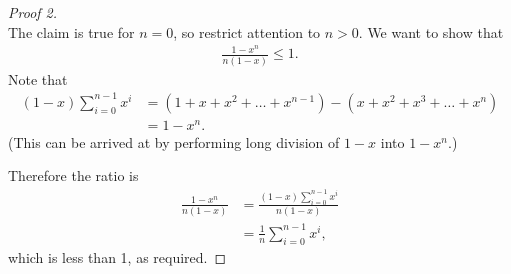 \begin{proof}[Proof 2]~\\
  The claim is true for $n=0$, so restrict attention to $n > 0$. We want to show that
  \begin{align*}
    \frac{1 - x^n}{n(1 - x)} \leq 1.
  \end{align*}
  Note that
  \begin{align*}
    (1 - x)\sum_{i=0}^{n-1}x^i &= (1 + x + x^2 + \ldots + x^{n-1}) - (x + x^2 + x^3 + \ldots + x^n)\\
                              &= 1 - x^n.
  \end{align*}
  (This can be arrived at by performing long division of $1-x$ into $1 - x^n$.)

  Therefore the ratio is
  \begin{align*}
    \frac{1 - x^n}{n(1 - x)} &= \frac{(1 - x)\sum_{i=0}^{n-1}x^i}{n(1 - x)}\\
                             &= \frac{1}{n}\sum_{i=0}^{n-1}x^i,
  \end{align*}
  which is less than 1, as required.

\end{proof}
